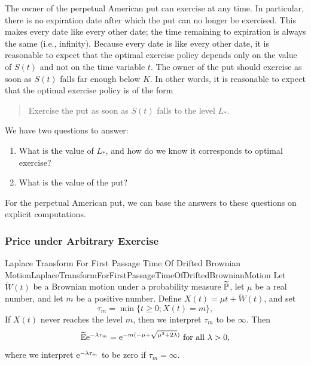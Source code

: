 The owner of the perpetual American put can exercise at any time. In particular, there is no expiration date after which the put can no longer be exercised. This makes every date like every other date; the time remaining to expiration is always the same (i.e., infinity). Because every date is like every other date, it is reasonable to expect that the optimal exercise policy depends only on the value of $S(t)$ and not on the time variable $t$. The owner of the put should exercise as soon as $S(t)$ falls far enough below $K$. In other words, it is reasonable to expect that the optimal exercise policy is of the form
\begin{quote} Exercise the put as soon as $S(t)$ falls to the level $L_*$.
\end{quote}

We have two questions to answer:
\begin{enumerate}[label=(\roman*)] \item What is the value of $L_*$, and how do we know it corresponds to optimal exercise?
	\item What is the value of the put?
\end{enumerate}

For the perpetual American put, we can base the answers to these questions on explicit computations.

\subsubsection{Price under Arbitrary Exercise}

\begin{thm}{Laplace Transform For First Passage Time Of Drifted Brownian Motion}{LaplaceTransformForFirstPassageTimeOfDriftedBrownianMotion}
	Let $\widetilde{W}(t)$ be a Brownian motion under a probability measure $\widetilde{\mathbb{P}}$, let $\mu$ be a real number, and let $m$ be a positive number. Define $X(t) = \mu t + \widetilde{W}(t)$, and set
	\[
		\tau_m = \min\{t \ge 0 ; X(t) = m\},
	\]
	If $X(t)$ never reaches the level $m$, then we interpret $\tau_m$ to be $\infty$. Then
	\begin{equation} \label{eq:LaplaceTransformFormula}
		\widetilde{\mathbb{E}}\mathrm{e}^{-\lambda \tau_m} = \mathrm{e}^{-m(-\mu+\sqrt{\mu^2+2\lambda})} \text{ for all } \lambda > 0,
	\end{equation}
	where we interpret $\mathrm{e}^{-\lambda \tau_m}$ to be zero if $\tau_m = \infty$.
\end{thm}

